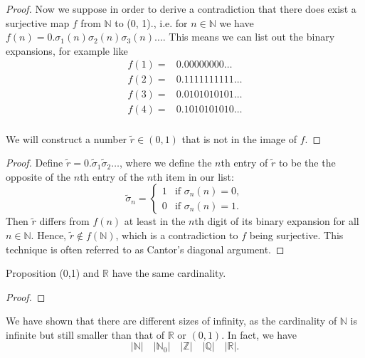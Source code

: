 \documentclass [aspectratio=169]{beamer}
\newcommand{\R}{{\mathbb{R}}}
\newcommand{\Z}{{\mathbb{Z}}}
\newcommand{\N}{{\mathbb{N}}}
\newcommand{\Q}{{\mathbb{Q}}}
\begin{document}
\begin{frame}
\begin{proof}
Now we suppose in order to derive a contradiction that there does exist a surjective map $f$ from $\N$ to (0, 1)., i.e. for $n \in \N$ we have $f(n) = 0.\sigma_1(n)\sigma_2(n)\sigma_3(n)\ldots$. This means we can list out the binary expansions, for example like
\begin{align*}
f(1)= & 0.{0}0000000\ldots \\
f(2)=& 0.1{1}11111111\ldots\\
f(3)=& 0.01{0}1010101\ldots  \\
f(4)= & 0.101{0}101010\ldots  \\
& 
\end{align*}

We will construct a number $\tilde r \in (0,1)$ that is not in the image of $f$. 
\end{proof}
\end{frame}


\begin{frame}
\begin{proof}
Define $\tilde r = 0.\tilde\sigma_1 \tilde\sigma_2 \ldots$, where we define the $n$th entry of $\tilde r$ to be the the opposite of the  $n$th entry of the $n$th item in our list:
\begin{equation*}
    \tilde\sigma_n = \begin{cases} 1 & \text{if } \sigma_n(n) = 0, \\
    0 & \text{if }  \sigma_n(n) = 1.
    \end{cases}
\end{equation*}
Then $\tilde r$ differs from $f(n)$ at least in the $n$th digit of its binary expansion for all $n\in \N$. Hence, $\tilde r\not\in f(\N)$, which is a contradiction to $f$ being surjective. This technique is often referred to as Cantor's diagonal argument. 
\end{proof}
\end{frame}

\begin{frame}
\begin{exampleblock}{Proposition}
(0,1) and $\R$ have the same cardinality. 
\end{exampleblock}
\begin{proof}
\vspace{1.5cm}
\end{proof}

We have shown that there are different sizes of infinity, as the cardinality of $\N$ is infinite but still smaller than that of $\R$ or $(0,1)$. In fact, we have
$$ |\N| \quad |\N_0| \quad  |\Z|  \quad |\Q|  \quad |\R|.$$


\end{frame}
\end{document}
